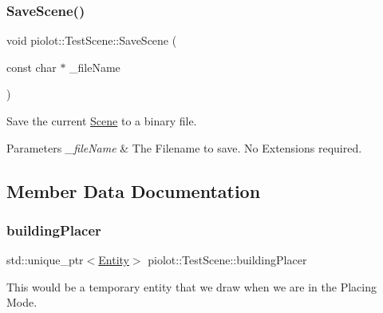 \mbox{\label{classpiolot_1_1_test_scene_a8fcd4f46ccdb6c49741bb37364d9bb0e}} 
\subsubsection{\texorpdfstring{Save\+Scene()}{SaveScene()}}
{\footnotesize\ttfamily void piolot\+::\+Test\+Scene\+::\+Save\+Scene (\begin{DoxyParamCaption}\item[{const char $\ast$}]{\+\_\+file\+Name }\end{DoxyParamCaption})}



Save the current \mbox{\hyperlink{classpiolot_1_1_scene}{Scene}} to a binary file. 


\begin{DoxyParams}{Parameters}
{\em \+\_\+file\+Name} & The Filename to save. No Extensions required. \\
\hline
\end{DoxyParams}


\subsection{Member Data Documentation}
\mbox{\label{classpiolot_1_1_test_scene_ae0a460b8b6b3d352f92be069a6d69fb3}} 
\subsubsection{\texorpdfstring{building\+Placer}{buildingPlacer}}
{\footnotesize\ttfamily std\+::unique\+\_\+ptr$<$\mbox{\hyperlink{classpiolot_1_1_entity}{Entity}}$>$ piolot\+::\+Test\+Scene\+::building\+Placer\hspace{0.3cm}{\ttfamily [private]}}



This would be a temporary entity that we draw when we are in the Placing Mode. 

\mbox{\label{classpiolot_1_1_test_scene_a6a9b96c88caf979ba3e763c11653b290}} 
